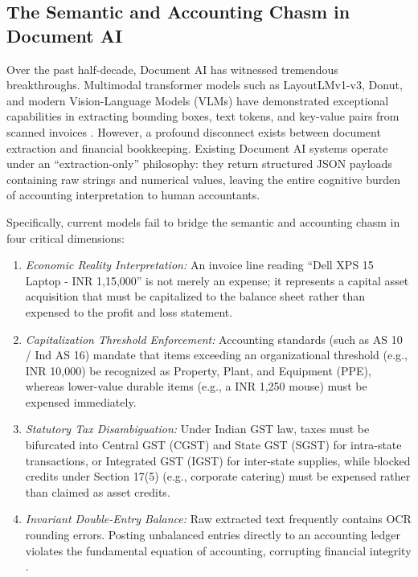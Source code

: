 \documentclass[conference]{IEEEtran}
\begin{document}
\subsection{The Semantic and Accounting Chasm in Document AI}
Over the past half-decade, Document AI has witnessed tremendous breakthroughs. Multimodal transformer models such as LayoutLMv1-v3, Donut, and modern Vision-Language Models (VLMs) have demonstrated exceptional capabilities in extracting bounding boxes, text tokens, and key-value pairs from scanned invoices \cite{yao2026multimodal, xu2020layoutlm, xu2021layoutlmv2, huang2022layoutlmv3}. However, a profound disconnect exists between document extraction and financial bookkeeping. Existing Document AI systems operate under an ``extraction-only'' philosophy: they return structured JSON payloads containing raw strings and numerical values, leaving the entire cognitive burden of accounting interpretation to human accountants.

Specifically, current models fail to bridge the semantic and accounting chasm in four critical dimensions:
\begin{enumerate}
    \item \textit{Economic Reality Interpretation:} An invoice line reading ``Dell XPS 15 Laptop - INR 1,15,000'' is not merely an expense; it represents a capital asset acquisition that must be capitalized to the balance sheet rather than expensed to the profit and loss statement.
    \item \textit{Capitalization Threshold Enforcement:} Accounting standards (such as AS 10 / Ind AS 16) mandate that items exceeding an organizational threshold (e.g., INR 10,000) be recognized as Property, Plant, and Equipment (PPE), whereas lower-value durable items (e.g., a INR 1,250 mouse) must be expensed immediately.
    \item \textit{Statutory Tax Disambiguation:} Under Indian GST law, taxes must be bifurcated into Central GST (CGST) and State GST (SGST) for intra-state transactions, or Integrated GST (IGST) for inter-state supplies, while blocked credits under Section 17(5) (e.g., corporate catering) must be expensed rather than claimed as asset credits.
    \item \textit{Invariant Double-Entry Balance:} Raw extracted text frequently contains OCR rounding errors. Posting unbalanced entries directly to an accounting ledger violates the fundamental equation of accounting, corrupting financial integrity \cite{pacioli1494summa}.
\end{enumerate}
\end{document}
